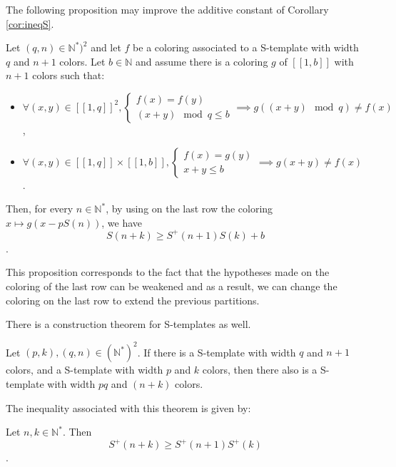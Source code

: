 The following proposition may improve the additive constant of Corollary \ref{cor:ineqS}.

\begin{proposition}
\label{prop:rafStemp}
Let \((q, n) \in \mathbb{N}^*)^2\) and let \(f\) be a coloring associated to a S-template with width \(q\) and \(n+1\) 
colors. Let \(b \in \mathbb{N}\) and assume there is a coloring \(g\) of 
\([\![1, b]\!]\) with \(n+1\) colors such that:
	
\begin{itemize}
\item \(\forall (x, y) \in [\![1, q]\!]^2, \left\{
	\begin{array}{l}
		f(x) = f(y) \\
		(x + y) \mod q \leqslant b
	\end{array}
	\right. \implies g((x + y) \mod q) \neq f(x)\),
\item \(\forall (x, y) \in [\![1, q]\!] \times  [\![1, b]\!],  \left\{
	\begin{array}{l}
		f(x) = g(y) \\
		x + y \leqslant b
	\end{array}
	\right. \implies g(x + y) \neq f(x)\).
\end{itemize}
	
Then, for every \(n \in \mathbb{N}^*\), by using on the last row the coloring \(x \longmapsto g(x - p S(n))\), we have
\[ S(n+k) \geqslant S^+(n+1)S(k) + b\].
\end{proposition}
This proposition corresponds to the fact that the hypotheses made on the coloring of the last row can be weakened and as a result, we can change the coloring on the last row to extend the previous partitions.
\newline

There is a construction theorem for S-templates as well.

\begin{theorem}
	Let \((p,k), (q,n) \in (\mathbb{N}^*)^2\). If there is a S-template with width \(q\) and \(n+1\) colors,
	and a S-template with width \(p\) and \(k\) colors, then there also is a S-template with width \(pq\) and \((n+k)\) 
	colors.
	\end{theorem}
	
	The inequality associated with this theorem is given by:
	
\begin{corollary}
	Let \(n, k \in \mathbb{N}^*\). Then
	\[ S^+(n+k) \geqslant S^+(n+1)S^+(k) \].
\end{corollary}

